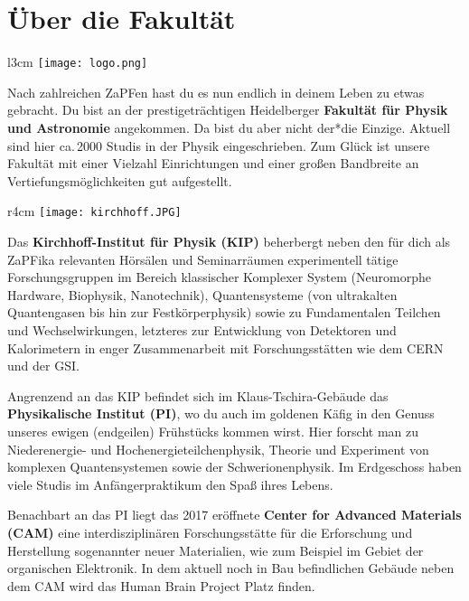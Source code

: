
\section{Über die Fakultät}

\begin{wrapfigure}{l}{3cm}
\texttt{[image: logo.png]}
\end{wrapfigure}



Nach zahlreichen ZaPFen hast du es nun endlich in deinem Leben zu etwas gebracht. Du bist an der prestigeträchtigen Heidelberger \textbf{Fakultät für Physik und Astronomie} angekommen. Da bist du aber nicht der*die Einzige.
Aktuell sind hier ca.\,2000 Studis in der Physik eingeschrieben.
Zum Glück ist unsere Fakultät mit einer Vielzahl Einrichtungen und einer großen Bandbreite an Vertiefungsmöglichkeiten gut aufgestellt.\\

\begin{wrapfigure}{r}{4cm}
\texttt{[image: kirchhoff.JPG]}
\end{wrapfigure}

Das \textbf{Kirchhoff-Institut für Physik (KIP)} beherbergt neben den für dich als ZaPFika relevanten Hörsälen und Seminarräumen experimentell tätige Forschungsgruppen im Bereich klassischer Komplexer System (Neuromorphe Hardware, Biophysik, Nanotechnik), Quantensysteme (von ultrakalten Quantengasen bis hin zur Festkörperphysik) sowie zu Fundamentalen Teilchen und Wechselwirkungen, letzteres zur Entwicklung von Detektoren und Kalorimetern in enger Zusammenarbeit mit Forschungsstätten wie dem CERN und der GSI.

Angrenzend an das KIP befindet sich im Klaus-Tschira-Gebäude das \textbf{Physikalische Institut (PI)}, wo du auch im goldenen Käfig in den Genuss unseres ewigen (endgeilen) Frühstücks kommen wirst. Hier forscht man zu Niederenergie- und Hochenergieteilchenphysik, Theorie und Experiment von komplexen Quantensystemen sowie der Schwerionenphysik. Im Erdgeschoss haben viele Studis im Anfängerpraktikum den Spaß ihres Lebens.

Benachbart an das PI liegt das 2017 eröffnete \textbf{Center for Advanced Materials (CAM)} eine interdisziplinären Forschungsstätte für die Erforschung und Herstellung sogenannter neuer Materialien, wie zum Beispiel im Gebiet der organischen Elektronik.
In dem aktuell noch in Bau befindlichen Gebäude neben dem CAM wird das Human Brain Project Platz finden. 


